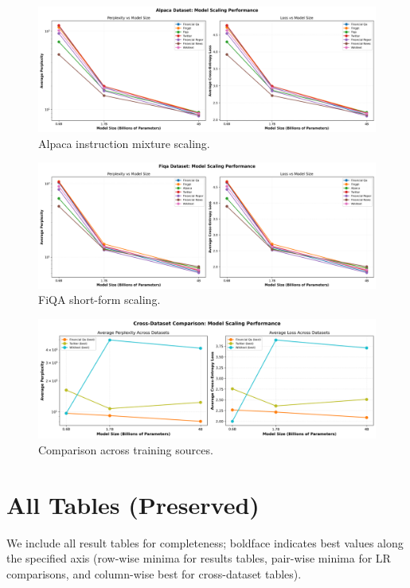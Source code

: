 \begin{figure}[H]
  \centering
  \includegraphics[width=\textwidth]{../thesis/figures/scaling_alpaca.png}
  \caption{Alpaca instruction mixture scaling.}\label{fig:scaling_alpaca}
\end{figure}

\begin{figure}[H]
  \centering
  \includegraphics[width=\textwidth]{../thesis/figures/scaling_fiqa.png}
  \caption{FiQA short-form scaling.}\label{fig:scaling_fiqa}
\end{figure}

\begin{figure}[H]
  \centering
  \includegraphics[width=\textwidth]{../thesis/figures/scaling_comparison_all.png}
  \caption{Comparison across training sources.}\label{fig:scaling_comparison_all}
\end{figure}

\section{All Tables (Preserved)}
We include all result tables for completeness; boldface indicates best values along the specified axis (row-wise minima for results tables, pair-wise minima for LR comparisons, and column-wise best for cross-dataset tables).

